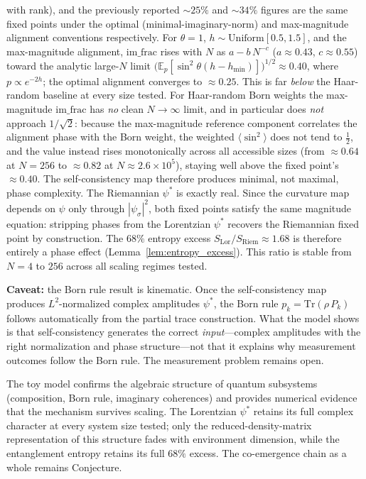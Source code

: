 \documentclass[12pt,a4paper]{article}
\theoremstyle{definition}
\theoremstyle{remark}
\begin{document}
\begin{itemize}
with rank), and the previously reported $\sim\!25\%$ and $\sim\!34\%$
figures are the same fixed points under the optimal
(minimal-imaginary-norm) and max-magnitude alignment conventions
respectively. For $\theta = 1$, $h \sim \mathrm{Uniform}[0.5,1.5]$, and
the max-magnitude alignment, $\mathrm{im\_frac}$ rises with $N$ as
$a - b\,N^{-c}$ ($a \approx 0.43$, $c \approx 0.55$) toward the analytic
large-$N$ limit $\big(\mathbb{E}_p[\sin^2\theta(h-h_{\min})]\big)^{1/2}
\approx 0.40$, where $p \propto e^{-2h}$; the optimal alignment converges
to $\approx 0.25$. This is far \emph{below} the Haar-random baseline at every
size tested. For Haar-random Born weights the max-magnitude $\mathrm{im\_frac}$
has \emph{no} clean $N \to \infty$ limit, and in particular does \emph{not}
approach $1/\sqrt{2}$: because the max-magnitude reference component correlates
the alignment phase with the Born weight, the weighted $\langle\sin^2\rangle$
does not tend to $\tfrac12$, and the value instead rises monotonically across
all accessible sizes (from $\approx 0.64$ at $N = 256$ to $\approx 0.82$ at
$N \approx 2.6\times10^{5}$), staying well above the fixed point's
$\approx 0.40$. The self-consistency map therefore produces minimal, not
maximal, phase complexity.
The Riemannian $\psi^*$ is exactly real. Since the curvature map depends
on $\psi$ only through $|\psi_\sigma|^2$, both fixed points satisfy the
same magnitude equation: stripping phases from the Lorentzian $\psi^*$
recovers the Riemannian fixed point by construction. The $68\%$
entropy excess $S_{\mathrm{Lor}} / S_{\mathrm{Riem}} \approx 1.68$
is therefore entirely a phase effect
(Lemma~\ref{lem:entropy_excess}). This ratio is stable from
$N = 4$ to $256$ across all scaling regimes tested.
\end{itemize}
\textbf{Caveat:} the Born rule result is kinematic. Once the
self-consistency map produces $L^2$-normalized complex amplitudes
$\psi^*$, the Born rule $p_k = \mathrm{Tr}(\rho\, P_k)$ follows
automatically from the partial trace construction. What the model shows
is that self-consistency generates the correct \emph{input}---complex
amplitudes with the right normalization and phase structure---not that it
explains why measurement outcomes follow the Born rule. The measurement
problem remains open.

The toy model confirms the algebraic structure of quantum subsystems
(composition, Born rule, imaginary coherences) and provides numerical evidence
that the mechanism survives scaling. The Lorentzian $\psi^*$ retains
its full complex character at every system size tested; only the
reduced-density-matrix representation of this structure fades with
environment dimension, while the entanglement entropy retains its full
$68\%$ excess. The co-emergence chain as a whole remains Conjecture.
\end{document}
